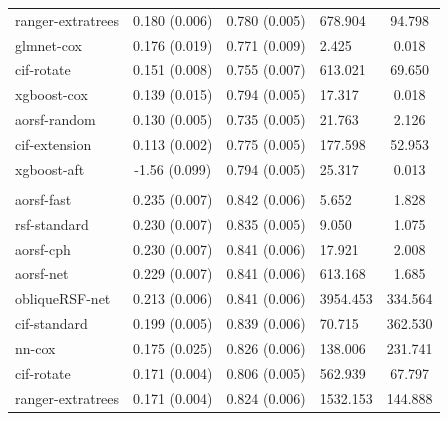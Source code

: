 \documentclass[twoside,11pt]{article}\usepackage[]{graphicx}\usepackage[]{xcolor}
\newenvironment{knitrout}{}{} %
\begin{document}
\begin{knitrout}
\begin{longtable}[t]{lcclc}
\hspace{1em}ranger-extratrees & 0.180 (0.006) & 0.780 (0.005) & 678.904 & 94.798\\
\hspace{1em}glmnet-cox & 0.176 (0.019) & 0.771 (0.009) & 2.425 & 0.018\\
\hspace{1em}cif-rotate & 0.151 (0.008) & 0.755 (0.007) & 613.021 & 69.650\\
\hspace{1em}xgboost-cox & 0.139 (0.015) & 0.794 (0.005) & 17.317 & 0.018\\
\hspace{1em}aorsf-random & 0.130 (0.005) & 0.735 (0.005) & 21.763 & 2.126\\
\hspace{1em}cif-extension & 0.113 (0.002) & 0.775 (0.005) & 177.598 & 52.953\\
\hspace{1em}xgboost-aft & -1.56 (0.099) & 0.794 (0.005) & 25.317 & 0.013\\
\addlinespace[0.3em]
\hline
\multicolumn{5}{l}{\textit{\textbf{ARIC; heart failure, n = 13623, p = 41}}}\\
\hline
\hspace{1em}aorsf-fast & 0.235 (0.007) & 0.842 (0.006) & 5.652 & 1.828\\
\hspace{1em}rsf-standard & 0.230 (0.007) & 0.835 (0.005) & 9.050 & 1.075\\
\hspace{1em}aorsf-cph & 0.230 (0.007) & 0.841 (0.006) & 17.921 & 2.008\\
\hspace{1em}aorsf-net & 0.229 (0.007) & 0.841 (0.006) & 613.168 & 1.685\\
\hspace{1em}obliqueRSF-net & 0.213 (0.006) & 0.841 (0.006) & 3954.453 & 334.564\\
\hspace{1em}cif-standard & 0.199 (0.005) & 0.839 (0.006) & 70.715 & 362.530\\
\hspace{1em}nn-cox & 0.175 (0.025) & 0.826 (0.006) & 138.006 & 231.741\\
\hspace{1em}cif-rotate & 0.171 (0.004) & 0.806 (0.005) & 562.939 & 67.797\\
\hspace{1em}ranger-extratrees & 0.171 (0.004) & 0.824 (0.006) & 1532.153 & 144.888\\

\end{longtable}
\end{knitrout}
\end{document}
